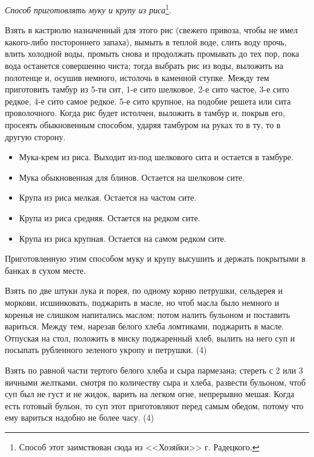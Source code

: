 \emph{Способ приготовлять муку и крупу из риса}\footnote{Способ этот заимствован сюда из <<Хозяйки>> г. Радецкого.}.

Взять в кастрюлю назначенный для этого рис (свежего привоза, чтобы не имел какого-либо постороннего запаха), вымыть в теплой воде, слить воду прочь, влить холодной воды, промыть снова и продолжать промывать до тех пор, пока вода останется совершенно чиста; тогда выбрать рис из воды, выложить на полотенце и, осушив немного, истолочь в каменной ступке. Между тем приготовить тамбур из 5-ти сит, 1-е сито шелковое, 2-е сито частое, 3-е сито редкое, 4-е сито самое редкое. 5-е сито крупное, на подобие решета или сита проволочного. Когда рис будет истолчен, выложить в тамбур и, покрыв его, просеять обыкновенным способом, ударяя тамбуром на руках то в ту, то в другую сторону.

\begin{itemize}
	\item Мука-крем из риса. Выходит из-под шелкового сита и остается в тамбуре.
	\item Мука обыкновенная для блинов. Остается на шелковом сите.
	\item  Крупа из риса мелкая. Остается на частом сите.
	\item Крупа из риса средняя. Остается на редком сите.
	\item Крупа из риса крупная. Остается на самом редком сите.
\end{itemize}

Приготовленную этим способом муку и крупу высушить и держать покрытыми в банках в сухом месте.


Взять по две штуки лука и порея, по одному корню петрушки, сельдерея и моркови, исшинковать, поджарить в масле, но чтоб масла было немного и коренья не слишком напитались маслом; потом налить бульоном и поставить вариться. Между тем, нарезав белого хлеба ломтиками, поджарить в масле. Отпуская на стол, положить в миску поджаренный хлеб, вылить на него суп и посыпать рубленного зеленого укропу и петрушки. (4)


Взять по равной части тертого белого хлеба и сыра пармезана; стереть с 2 или 3 яичными желтками, смотря по количеству сыра и хлеба, развести бульоном, чтоб суп был не густ и не жидок, варить на легком огне, непрерывно мешая. Когда есть готовый бульон, то суп этот приготовляют перед самым обедом, потому что ему вариться надобно не более часу. (4)

